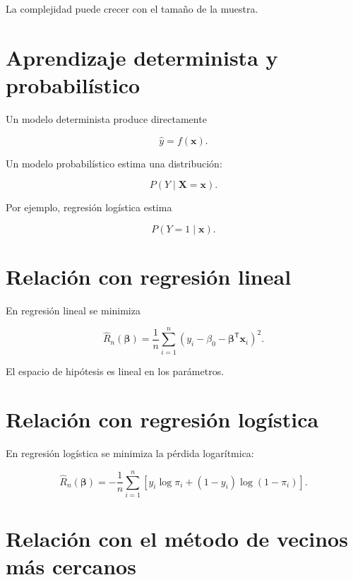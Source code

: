 \documentclass[
  spanish,
  10.5pt,
  letterpaper,
  DIV=11,
  numbers=noendperiod,
  oneside,
  open=any]{scrreprt}
\theoremstyle{definition}
\theoremstyle{definition}
\theoremstyle{plain}
\theoremstyle{remark}
\begin{document}
La complejidad puede crecer con el tamaño de la muestra.

\section*{Aprendizaje determinista y
probabilístico}\label{aprendizaje-determinista-y-probabiluxedstico}


Un modelo determinista produce directamente

\[
\widehat{y}=f(\mathbf{x}).
\]

Un modelo probabilístico estima una distribución:

\[
P(Y\mid\mathbf{X}=\mathbf{x}).
\]

Por ejemplo, regresión logística estima

\[
P(Y=1\mid\mathbf{x}).
\]

\section*{Relación con regresión
lineal}\label{relaciuxf3n-con-regresiuxf3n-lineal-2}


En regresión lineal se minimiza

\[
\widehat{R}_n(\boldsymbol{\beta})
=
\frac{1}{n}
\sum_{i=1}^{n}
(
y_i
-
\beta_0
-
\boldsymbol{\beta}^{\mathsf T}\mathbf{x}_i
)^2.
\]

El espacio de hipótesis es lineal en los parámetros.

\section*{Relación con regresión
logística}\label{relaciuxf3n-con-regresiuxf3n-loguxedstica-2}


En regresión logística se minimiza la pérdida logarítmica:

\[
\widehat{R}_n(\boldsymbol{\beta})
=
-
\frac{1}{n}
\sum_{i=1}^{n}
\left[
y_i\log\pi_i
+
(1-y_i)\log(1-\pi_i)
\right].
\]

\section*{Relación con el método de vecinos más
cercanos}\label{relaciuxf3n-con-el-muxe9todo-de-vecinos-muxe1s-cercanos}
\end{document}
